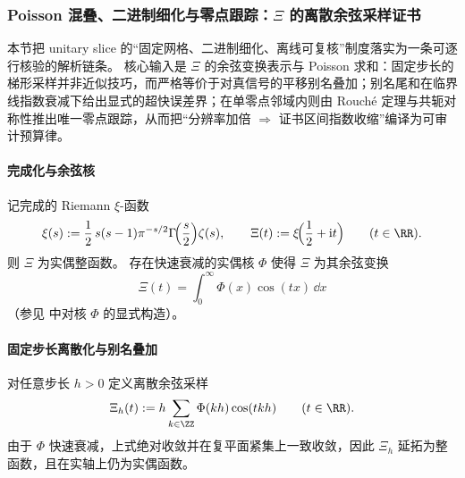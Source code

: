 \subsubsection{Poisson 混叠、二进制细化与零点跟踪：\texorpdfstring{$\Xi$}{Xi} 的离散余弦采样证书}\label{subsubsec:xi-dyadic-aliasing-zero-tracking}
本节把 unitary slice 的“固定网格、二进制细化、离线可复核”制度落实为一条可逐行核验的解析链条。
核心输入是 \(\Xi\) 的余弦变换表示与 Poisson 求和：固定步长的梯形采样并非近似技巧，而严格等价于对真信号的平移别名叠加；别名尾和在临界线指数衰减下给出显式的超快误差界；在单零点邻域内则由 Rouch\'e 定理与共轭对称性推出唯一零点跟踪，从而把“分辨率加倍 \(\Rightarrow\) 证书区间指数收缩”编译为可审计预算律。

\paragraph{完成化与余弦核}
记完成的 Riemann \(\xi\)-函数
\[
\xi(s):=\frac12\,s(s-1)\pi^{-s/2}\Gamma\!\Bigl(\frac{s}{2}\Bigr)\zeta(s),
\qquad
\Xi(t):=\xi\!\Bigl(\frac12+\mathrm{i}t\Bigr)\qquad(t\in\RR).
\]
则 \(\Xi\) 为实偶整函数。
存在快速衰减的实偶核 \(\Phi\) 使得 \(\Xi\) 为其余弦变换
\begin{equation}\label{eq:xi-cosine-kernel-representation}
\boxed{\;
\Xi(t)=\int_{0}^{\infty}\Phi(x)\cos(tx)\,\dd x\;}
\end{equation}
（参见 \cite{Shi2015RealRootedPolyaXi} 中对核 \(\Phi\) 的显式构造）。

\paragraph{固定步长离散化与别名叠加}
对任意步长 \(h>0\) 定义离散余弦采样
\begin{equation}\label{eq:xi-dyadic-discrete-cosine-sampling}
\Xi_h(t):=
h\sum_{k\in\ZZ}\Phi(kh)\cos(tkh)\qquad(t\in\RR).
\end{equation}
由于 \(\Phi\) 快速衰减，上式绝对收敛并在复平面紧集上一致收敛，因此 \(\Xi_h\) 延拓为整函数，且在实轴上仍为实偶函数。

